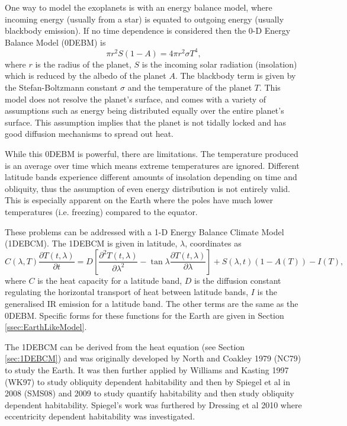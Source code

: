 \documentclass[12pt, onecolumn]{revtex4-2}    %
\newcommand{\partialderiv}[2]{\frac{\partial {#1}}{\partial {#2}}}
\newcommand{\partialderivsecnd}[2]{\frac{\partial^2 {#1}}{\partial {#2}^2}}
\begin{document}
One way to model the exoplanets is with an energy balance model, where incoming energy (usually from a star) is equated to outgoing energy (usually blackbody emission).
If no time dependence is considered then the 0-D Energy Balance Model (0DEBM) is 
\begin{equation}
  \pi r^2 S(1-A) = 4 \pi r^2 \sigma T^4,
  \label{eq:0DEBCM}
\end{equation}
where $r$ is the radius of the planet, $S$ is the incoming solar radiation (insolation) which is reduced by the albedo of the planet $A$.
The blackbody term is given by the Stefan-Boltzmann constant $\sigma$ and the temperature of the planet $T$.
This model does not resolve the planet's surface, and comes with a variety of assumptions such as energy being distributed equally over the entire planet's surface.
This assumption implies that the planet is not tidally locked and has good diffusion mechanisms to spread out heat.

While this 0DEBM is powerful, there are limitations.
The temperature produced is an average over time which means extreme temperatures are ignored.
Different latitude bands experience different amounts of insolation depending on time and obliquity, thus the assumption of even energy distribution is not entirely valid.
This is especially apparent on the Earth where the poles have much lower temperatures (i.e. freezing) compared to the equator.

%
These problems can be addressed with a 1-D Energy Balance Climate Model (1DEBCM).
The 1DEBCM is given in latitude, $\lambda$, coordinates as
\begin{equation}
  C(\lambda, T) \partialderiv{T(t, \lambda)}{t} = D\left[\partialderivsecnd{T(t, \lambda)}{\lambda} - \tan\lambda\partialderiv{T(t, \lambda)}{\lambda}\right] + S(\lambda, t)(1-A(T)) - I(T),
  \label{eq:1DEBCM}
\end{equation}
where $C$ is the heat capacity for a latitude band, $D$ is the diffusion constant regulating the horizontal transport of heat between latitude bands, $I$ is the generalised IR emission for a latitude band. The other terms are the same as the 0DEBM.
Specific forms for these functions for the Earth are given in Section \ref{ssec:EarthLikeModel}.

The 1DEBCM can be derived from the heat equation (see Section \ref{sec:1DEBCM}) and was originally developed by North and Coakley 1979 (NC79) \cite{NC79} to study the Earth.
It was then further applied by Williams and Kasting 1997 (WK97) \cite{WK97} to study obliquity dependent habitability and then by Spiegel et al in 2008 (SMS08) \cite{SMS08} and 2009 \cite{SMS09} to study quantify habitability and then study obliquity dependent habitability.
Spiegel's work was furthered by Dressing et al 2010 \cite{Dressing10} where eccentricity dependent habitability was investigated.
\end{document}
